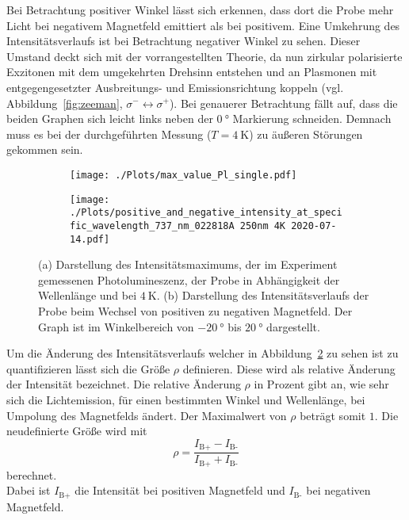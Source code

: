 Bei Betrachtung positiver Winkel lässt sich erkennen, dass dort die Probe mehr Licht bei negativem
Magnetfeld emittiert als bei positivem.
Eine Umkehrung des Intensitätsverlaufs ist bei Betrachtung negativer Winkel zu sehen.
Dieser Umstand deckt sich mit der vorrangestellten Theorie, da nun zirkular polarisierte Exzitonen mit dem 
umgekehrten Drehsinn entstehen und an Plasmonen mit entgegengesetzter Ausbreitungs- und Emissionsrichtung koppeln
(vgl. Abbildung~\ref{fig:zeeman}, $\sigma^- \leftrightarrow \sigma^+$).
Bei genauerer Betrachtung fällt auf, dass die beiden Graphen sich leicht links neben der $\SI{0}{\degree}$
Markierung schneiden.
Demnach muss es bei der durchgeführten Messung ($T = \SI{4}{\kelvin}$) zu äußeren Störungen gekommen sein.
\begin{figure}
    \begin{subfigure}{0.5\textwidth}
        \texttt{[image: ./Plots/max\_value\_Pl\_single.pdf]}
        \caption{}
        \label{fig:max}
    \end{subfigure}
    \begin{subfigure}{0.5\textwidth}
        \texttt{[image: ./Plots/positive\_and\_negative\_intensity\_at\_specific\_wavelength\_737\_nm\_022818A 250nm 4K 2020-07-14.pdf]}
        \caption{}
        \label{fig:i_pn}
    \end{subfigure}
    \caption{(a) Darstellung des Intensitätsmaximums, der im Experiment gemessenen Photolumineszenz,
             der Probe in Abhängigkeit der Wellenlänge und bei $\SI{4}{\kelvin}$.
             (b) Darstellung des Intensitätsverlaufs der Probe beim Wechsel von positiven zu negativen Magnetfeld.
             Der Graph ist im Winkelbereich von $\SI{-20}{\degree}$ bis $\SI{20}{\degree}$ dargestellt.
              }
    \label{fig:rho}
\end{figure}
\FloatBarrier
Um die Änderung des Intensitätsverlaufs welcher in Abbildung~\ref{fig:i_pn} zu sehen ist zu quantifizieren
lässt sich die Größe $\rho$ definieren. 
Diese wird als relative Änderung der Intensität bezeichnet.
Die relative Änderung $\rho$ in Prozent gibt an, 
wie sehr sich die Lichtemission, für einen bestimmten Winkel und Wellenlänge, bei Umpolung des Magnetfelds ändert. 
Der Maximalwert von $\rho$ beträgt somit $1$.
Die neudefinierte Größe wird mit 
\begin{equation}
    \rho = \frac{I_\text{B+} - I_\text{B-} }{ I_\text{B+} + I_\text{B-} }
\end{equation}
berechnet.\\
Dabei ist $I_\text{B+}$ die Intensität bei positiven Magnetfeld und $I_\text{B-}$ bei negativen Magnetfeld.

